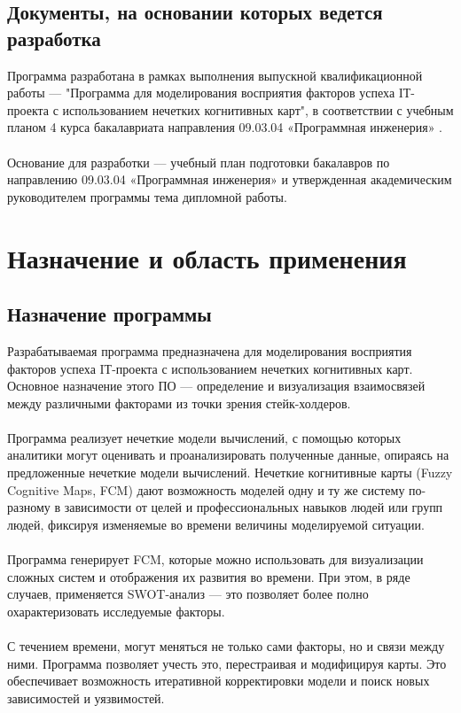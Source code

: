 \documentclass{article}
\begin{document}
    \subsection {Документы, на основании которых ведется разработка}
    Программа разработана в рамках выполнения выпускной квалификационной работы — "{}Программа для моделирования восприятия факторов успеха IТ-проекта с использованием нечетких когнитивных карт"{}, в соответствии с учебным планом 4 курса бакалавриата направления 09.03.04  «Программная инженерия» \cite{litlink10}.\\
    ~\\
    Основание для разработки — учебный план подготовки бакалавров по направлению 09.03.04 «Программная инженерия» \cite{litlink11} и утвержденная академическим руководителем программы тема дипломной работы.
    \newpage
    \section {Назначение и область применения}
    \subsection {Назначение программы}
    Разрабатываемая программа предназначена для моделирования восприятия факторов успеха IТ-проекта с использованием нечетких когнитивных карт. Основное назначение этого ПО — определение и визуализация взаимосвязей между различными факторами из точки зрения стейк-холдеров.\\
    ~\\
    Программа реализует нечеткие модели вычислений, с помощью которых аналитики могут оценивать и проанализировать полученные данные, опираясь на предложенные нечеткие модели вычислений. Нечеткие когнитивные карты (Fuzzy Cognitive Maps, FCM) дают возможность моделей одну и ту же систему по-разному в зависимости от целей и профессиональных навыков людей или групп людей, фиксируя изменяемые во времени величины моделируемой ситуации.\\
    ~\\
    Программа генерирует FCM, которые можно использовать для визуализации сложных систем и отображения их развития во времени. При этом, в ряде случаев, применяется SWOT-анализ — это позволяет более полно охарактеризовать исследуемые факторы.\\
    ~\\
    С течением времени, могут меняться не только сами факторы, но и связи между ними. Программа позволяет учесть это, перестраивая и модифицируя карты. Это обеспечивает возможность итеративной корректировки модели и поиск новых зависимостей и уязвимостей.\\
\end{document}
